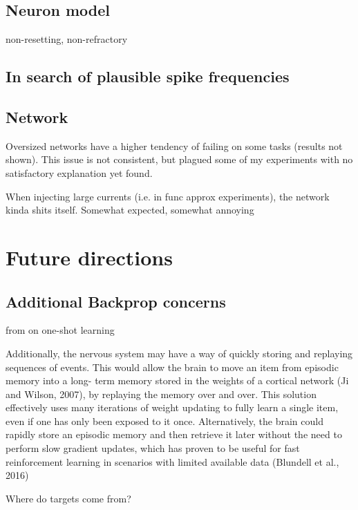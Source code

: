 \subsection*{Neuron model}

non-resetting, non-refractory


\subsection{In search of plausible spike frequencies}

\subsection*{Network}

Oversized networks have a higher tendency of failing on some tasks (results not shown). This issue is not consistent,
but plagued some of my experiments with no satisfactory explanation yet found.


 When injecting large currents (i.e. in func approx experiments), the network kinda shits itself. Somewhat
expected, somewhat annoying




\section{Future directions}

\subsection{Additional Backprop concerns}


from \citep{Marblestone2016} on one-shot learning

Additionally, the nervous system may have a way of quickly
storing and replaying sequences of events. This would allow
the brain to move an item from episodic memory into a long-
term memory stored in the weights of a cortical network (Ji and
Wilson, 2007), by replaying the memory over and over. This
solution effectively uses many iterations of weight updating to
fully learn a single item, even if one has only been exposed to
it once. Alternatively, the brain could rapidly store an episodic
memory and then retrieve it later without the need to perform
slow gradient updates, which has proven to be useful for
fast reinforcement learning in scenarios with limited available
data (Blundell et al., 2016)


Where do targets come from? \cite{Bengio2015}

